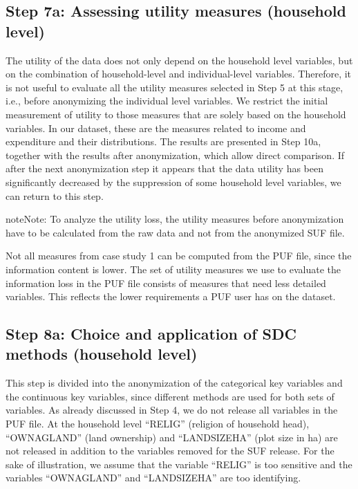 \documentclass[letterpaper,10pt,english]{sphinxmanual}
\begin{document}
\subsection{Step 7a: Assessing utility measures (household level)}
\label{\detokenize{casestudies:id12}}
The utility of the data does not only depend on the household level
variables, but on the combination of household-level and
individual-level variables. Therefore, it is not useful to evaluate all
the utility measures selected in Step 5 at this stage, i.e., before
anonymizing the individual level variables. We restrict the initial
measurement of utility to those measures that are solely based on the
household variables. In our dataset, these are the measures related to
income and expenditure and their distributions. The results are
presented in Step 10a, together with the results after anonymization,
which allow direct comparison. If after the next anonymization step it
appears that the data utility has been significantly decreased by the
suppression of some household level variables, we can return to this
step.

\begin{sphinxadmonition}{note}{Note:}
To analyze the utility loss, the utility measures before
anonymization have to be calculated from the raw data and not from the
anonymized SUF file.
\end{sphinxadmonition}

Not all measures from case study 1 can be
computed from the PUF file, since the information content is lower. The
set of utility measures we use to evaluate the information loss in the
PUF file consists of measures that need less detailed variables. This
reflects the lower requirements a PUF user has on the dataset.


\subsection{Step 8a: Choice and application of SDC methods (household level)}
\label{\detokenize{casestudies:step-8a-choice-and-application-of-sdc-methods-household-level}}
This step is divided into the anonymization of the categorical key
variables and the continuous key variables, since different methods are
used for both sets of variables. As already discussed in Step 4, we do
not release all variables in the PUF file. At the household level
“RELIG” (religion of household head), “OWNAGLAND” (land ownership) and
“LANDSIZEHA” (plot size in ha) are not released in addition to the
variables removed for the SUF release. For the sake of illustration, we
assume that the variable “RELIG” is too sensitive and the variables
“OWNAGLAND” and “LANDSIZEHA” are too identifying.
\end{document}
